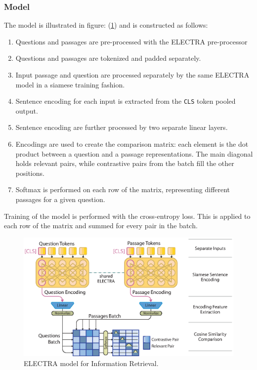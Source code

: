 \documentclass{article}
\newcommand{\code}[1]{\colorbox{light-gray}{\texttt{#1}}}
\begin{document}
\subsubsection{Model}
The model is illustrated in figure: (\ref{fig_electra_IR}) and is constructed as follows:

\begin{enumerate}
  \item Questions and passages are pre-processed with the ELECTRA pre-processor
  \item Questions and passages are tokenized and padded separately. 
  \item Input passage and question are processed separately by the same ELECTRA model in a siamese training fashion.
  \item Sentence encoding for each input is extracted from the \code{CLS} token pooled output.
  \item Sentence encoding are further processed by two separate linear layers.
  \item Encodings are used to create the comparison matrix: each element is the dot product between a question and a passage representations.
  The main diagonal holds relevant pairs, while contrastive pairs from the batch fill the other positions.
  \item Softmax is performed on each row of the matrix, representing different passages for a given question.
\end{enumerate}

Training of the model is performed with the cross-entropy loss. This is applied to each row of the matrix and summed for every pair in the batch.
\begin{figure}[h]
\includegraphics[width=\textwidth]{IR_ELECTRA_graph.eps}
\caption{ELECTRA model for Information Retrieval.} \label{fig_electra_IR}
\end{figure}
\end{document}
